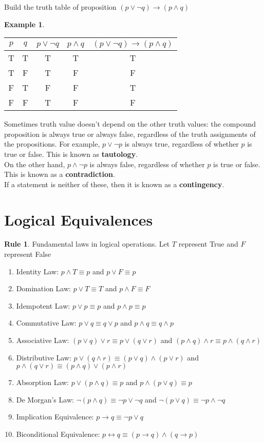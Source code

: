 \documentclass[11pt]{article}
\theoremstyle{definition}
\newtheorem{reg}{Rule}
\newtheorem{eg}{Example}
\begin{document}
Build the truth table of proposition $(p \lor \neg q) \rightarrow (p \land q)$
\begin{eg}
 \begin{center}
	\begin{tabular}{ |c|c|c|c|c|} 
 		\hline
 		$p$ & $q$ & $p \lor \neg q$ & $p \land q$ & $(p \lor \neg q) \rightarrow (p \land q)$\\
		\hline
 		T & T  & T & T & T\\
 		T & F & T & F& F\\
		F & T & F & F & T\\
		F & F & T & F & F\\
 		\hline
	\end{tabular}
\end{center}
\end{eg}
Sometimes truth value doesn't depend on the other truth values: the compound proposition is always true or always false, regardless of the truth assignments of the propositions. For example, $p \lor \neg p$ is always true, regardless of whether $p$ is true or false. This is known as \textbf{tautology}. \\

On the other hand, $p \land \neg p$ is always false, regardless of whether $p$ is true or false. This is known as a \textbf{contradiction}. \\

If a statement is neither of these, then it is known as a \textbf{contingency}. 

\section{Logical Equivalences}
\begin{reg}
Fundamental laws in logical operations. Let $T$ represent True and $F$ represent False
\begin{enumerate}
 \item Identity Law: $p \land T \equiv p$ and $p \lor F \equiv p$
\item Domination Law: $p \lor T \equiv T$ and $p \land F \equiv F$ 
\item Idempotent Law: $p \lor p \equiv p$ and $p \land p \equiv p$ 
\item Commutative Law: $p \lor q \equiv q \lor p$ and $p \land q \equiv q \land p$
\item Associative Law: $(p \lor q) \lor r \equiv p \lor (q \lor r)$ and $(p \land q) \land r \equiv p \land (q \land r)$ 
\item Distributive Law: $p \lor (q \land r) \equiv (p \lor q) \land (p \lor r)$ and $p \land (q \lor r) \equiv (p \land q) \lor (p \land r)$
\item Absorption Law: $p \lor (p \land q) \equiv p$ and $p \land (p \lor q) \equiv p$
\item De Morgan's Law: $\neg (p \land q) \equiv \neg p \lor \neg q $ and $\neg (p \lor q) \equiv \neg p \land \neg q$
\item Implication Equivalence: $p \rightarrow q \equiv \neg p \lor q$
\item Biconditional Equivalence: $p \longleftrightarrow q \equiv (p \rightarrow q) \land (q \rightarrow p)$
\end{enumerate}
\end{reg}
\end{document}
